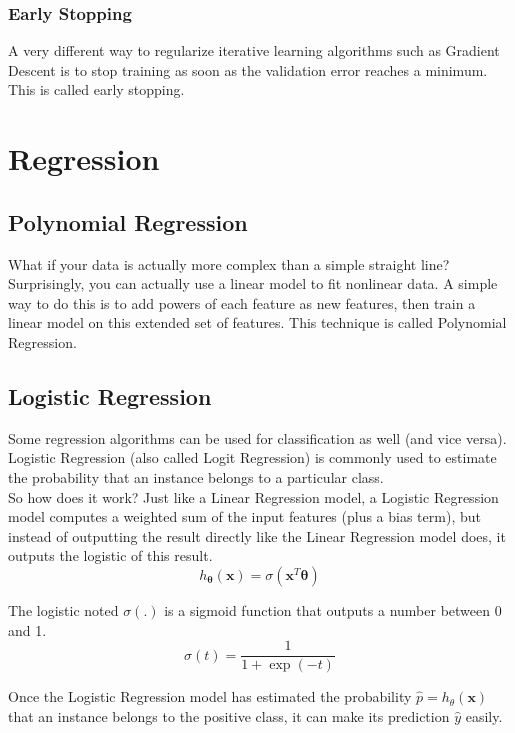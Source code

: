 \documentclass[french]{article}
\begin{document}
\subsubsection{Early Stopping}

A very different way to regularize iterative learning algorithms such as Gradient Descent is to stop training as soon as the validation error reaches a minimum. This is called early stopping.

\section{Regression}

\subsection{Polynomial Regression}

What if your data is actually more complex than a simple straight line? Surprisingly, you can actually use a linear model to fit nonlinear data. A simple way to do this is to add powers of each feature as new features, then train a linear model on this extended set of features. This technique is called Polynomial Regression.

\subsection{Logistic Regression}

Some regression algorithms can be used for classification as well (and vice versa). Logistic Regression (also called Logit Regression) is commonly used to estimate the probability that an instance belongs to a particular class.\\

So how does it work? Just like a Linear Regression model, a Logistic Regression model computes a weighted sum of the input features (plus a bias term), but instead of outputting the result directly like the Linear Regression model does, it outputs the logistic of this result.\\

\[h_{\bm{\theta}}(\bm{x}) = \sigma (\bm{x}^T \bm{\theta})\]

The logistic noted $\sigma(.)$ is a sigmoid function that outputs a number between 0 and 1.
\[\sigma(t) = \frac{1}{1+\exp{(-t)}}\]

Once the Logistic Regression model has estimated the probability $\hat p = h_{\theta}(\bm{x})$ that an instance belongs to the positive class, it can make its prediction $\hat y$ easily.
\end{document}
